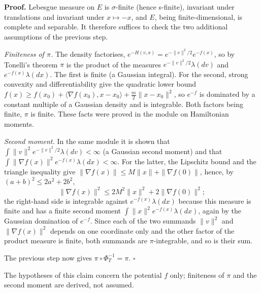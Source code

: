 \documentclass[11pt,a4paper]{article}
\begin{document}
\textbf{Proof.} Lebesgue measure on \(E\) is \(\sigma\)-finite (hence s-finite), invariant under translations and invariant under \(x\mapsto-x\), and \(E\), being finite-dimensional, is complete and separable. It therefore suffices to check the two additional assumptions of the previous step.




\emph{Finiteness of \(\pi\).} The density factorises, \(e^{-H(v,x)}=e^{-\|v\|^2/2}e^{-f(x)}\), so by Tonelli's theorem \(\pi\) is the product of the measures \(e^{-\|v\|^2/2}\lambda(dv)\) and \(e^{-f(x)}\lambda(dx)\). The first is finite (a Gaussian integral). For the second, strong convexity and differentiability give the quadratic lower bound \(f(x)\ge f(x_0)+\langle\nabla f(x_0),x-x_0\rangle+\frac m2\|x-x_0\|^2\), so \(e^{-f}\) is dominated by a constant multiple of a Gaussian density and is integrable. Both factors being finite, \(\pi\) is finite. These facts were proved in the module on Hamiltonian moments.




\emph{Second moment.} In the same module it is shown that \(\int\|v\|^2e^{-\|v\|^2/2}\lambda(dv)<\infty\) (a Gaussian second moment) and that \(\int\|\nabla f(x)\|^2e^{-f(x)}\lambda(dx)<\infty\). For the latter, the Lipschitz bound and the triangle inequality give \(\|\nabla f(x)\|\le M\|x\|+\|\nabla f(0)\|\), hence, by \((a+b)^2\le2a^2+2b^2\),
\[\|\nabla f(x)\|^2\le2M^2\|x\|^2+2\|\nabla f(0)\|^2 ;\]
the right-hand side is integrable against \(e^{-f(x)}\lambda(dx)\) because this measure is finite and has a finite second moment \(\int\|x\|^2e^{-f(x)}\lambda(dx)\), again by the Gaussian domination of \(e^{-f}\). Since each of the two summands \(\|v\|^2\) and \(\|\nabla f(x)\|^2\) depends on one coordinate only and the other factor of the product measure is finite, both summands are \(\pi\)-integrable, and so is their sum.




The previous step now gives \(\pi\circ\Phi_T^{-1}=\pi\). \(\square\)




The hypotheses of this claim concern the potential \(f\) only; finiteness of \(\pi\) and the second moment are derived, not assumed.
\end{document}
